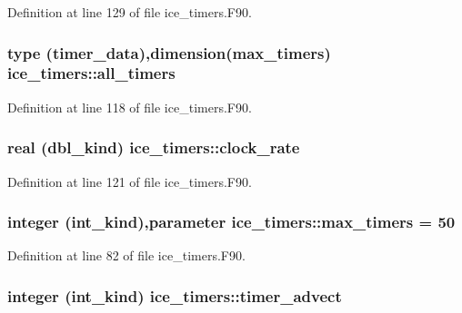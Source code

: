 Definition at line 129 of file ice\_\-timers.F90.\hypertarget{namespaceice__timers_a7bda531f2d88a00f031b6d6f8f104474}{
\subsubsection[{all\_\-timers}]{\setlength{\rightskip}{0pt plus 5cm}type ({\bf timer\_\-data}),dimension({\bf max\_\-timers}) {\bf ice\_\-timers::all\_\-timers}}}
\label{namespaceice__timers_a7bda531f2d88a00f031b6d6f8f104474}


Definition at line 118 of file ice\_\-timers.F90.\hypertarget{namespaceice__timers_a6e77da30d9249c18d6b65ff45dc46ea4}{
\subsubsection[{clock\_\-rate}]{\setlength{\rightskip}{0pt plus 5cm}real (dbl\_\-kind) {\bf ice\_\-timers::clock\_\-rate}}}
\label{namespaceice__timers_a6e77da30d9249c18d6b65ff45dc46ea4}


Definition at line 121 of file ice\_\-timers.F90.\hypertarget{namespaceice__timers_aa410a1135c41a4e3216716ae83adfd64}{
\subsubsection[{max\_\-timers}]{\setlength{\rightskip}{0pt plus 5cm}integer (int\_\-kind),parameter {\bf ice\_\-timers::max\_\-timers} = 50}}
\label{namespaceice__timers_aa410a1135c41a4e3216716ae83adfd64}


Definition at line 82 of file ice\_\-timers.F90.\hypertarget{namespaceice__timers_a661df1c3c16f3dbba252198a2de779c6}{
\subsubsection[{timer\_\-advect}]{\setlength{\rightskip}{0pt plus 5cm}integer (int\_\-kind) {\bf ice\_\-timers::timer\_\-advect}}}
\label{namespaceice__timers_a661df1c3c16f3dbba252198a2de779c6}


